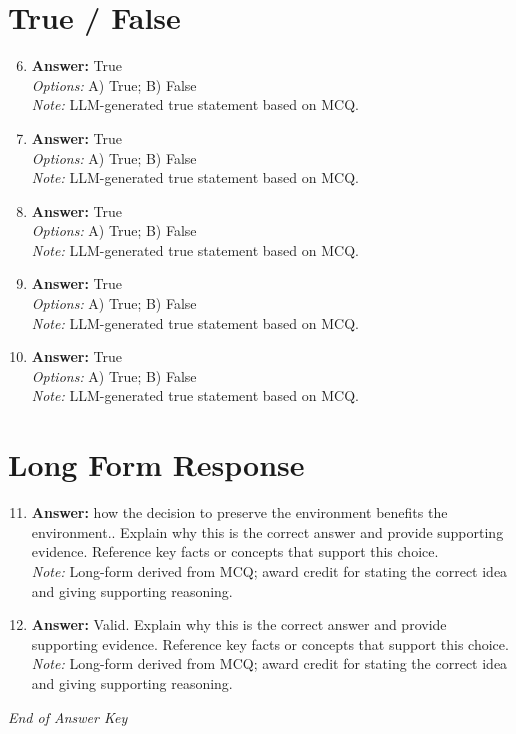 \documentclass[12pt]{article}
\begin{document}
\section*{True / False}
\begin{enumerate}[label=\arabic*.]
\setcounter{enumi}{5}
\item \textbf{Answer:} True
\\ \textit{Options:} A) True; B) False
\\ \textit{Note:} LLM-generated true statement based on MCQ.
\item \textbf{Answer:} True
\\ \textit{Options:} A) True; B) False
\\ \textit{Note:} LLM-generated true statement based on MCQ.
\item \textbf{Answer:} True
\\ \textit{Options:} A) True; B) False
\\ \textit{Note:} LLM-generated true statement based on MCQ.
\item \textbf{Answer:} True
\\ \textit{Options:} A) True; B) False
\\ \textit{Note:} LLM-generated true statement based on MCQ.
\item \textbf{Answer:} True
\\ \textit{Options:} A) True; B) False
\\ \textit{Note:} LLM-generated true statement based on MCQ.
\end{enumerate}

\section*{Long Form Response}
\begin{enumerate}[label=\arabic*.]
\setcounter{enumi}{10}
\item \textbf{Answer:} how the decision to preserve the environment benefits the environment.. Explain why this is the correct answer and provide supporting evidence. Reference key facts or concepts that support this choice.
\\ \textit{Note:} Long-form derived from MCQ; award credit for stating the correct idea and giving supporting reasoning.
\item \textbf{Answer:} Valid. Explain why this is the correct answer and provide supporting evidence. Reference key facts or concepts that support this choice.
\\ \textit{Note:} Long-form derived from MCQ; award credit for stating the correct idea and giving supporting reasoning.
\end{enumerate}

\vfill
\noindent\textit{End of Answer Key}
\end{document}
